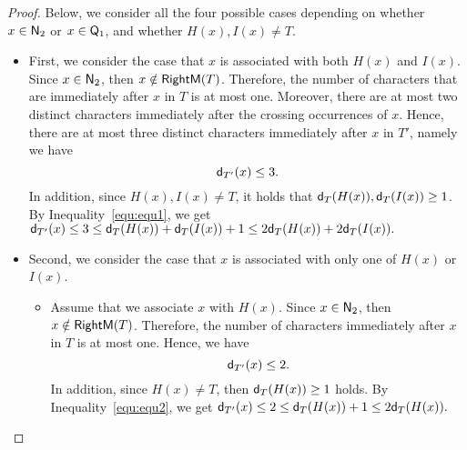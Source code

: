   \begin{proof}
    Below, we consider all the four possible cases depending on whether $x \in \mathsf{N}_{\mathrm{2}}$ or $x \in \mathsf{Q}_{\mathrm{1}}$, and whether $H(x), I(x) \neq T$. 

    \begin{itemize}
    \item
    First, we consider the case that $x$ is associated with both $H(x)$ and $I(x)$.
    Since $x \in \mathsf{N}_{\mathrm{2}}$, then
      $x \notin \mathsf{RightM}(T)$.
    Therefore, the number of characters that are immediately after $x$ in $T$ is at most one.
    Moreover, there are at most two distinct characters immediately after the crossing occurrences of $x$.
    Hence, there are at most three distinct characters immediately after $x$ in $T'$, namely we have 
    \begin{equation}\label{equ:equ1}
      \mathsf{d}_{T'}(x) \le 3.
    \end{equation}
    In addition, since ${H(x),I(x) \ne T}$, it holds that $\mathsf{d}_{T}(H(x)),\mathsf{d}_{T}(I(x)) \ge 1$.
    By Inequality~\ref{equ:equ1}, we get $\mathsf{d}_{T'}(x) \le 3 \le \mathsf{d}_{T}(H(x))+\mathsf{d}_{T}(I(x))+1 \le 2\mathsf{d}_{T}(H(x))+2\mathsf{d}_{T}(I(x)).$

    \item Second, we consider the case that $x$ is associated with only one of $H(x)$ or $I(x)$.
    \begin{itemize}
    \item
    Assume that we associate $x$ with $H(x)$.
    Since $x \in \mathsf{N}_{\mathrm{2}}$, then
      $x \notin \mathsf{RightM}(T)$.
    Therefore, the number of characters immediately after $x$ in $T$ is at most one.
    Hence, we have 
    \begin{equation}\label{equ:equ2}
      \mathsf{d}_{T'}(x) \le 2.
    \end{equation}
    In addition, since ${H(x) \ne T}$, then $\mathsf{d}_{T}(H(x)) \ge 1$ holds.
    By Inequality~\ref{equ:equ2}, we get $\mathsf{d}_{T'}(x) \le 2 \le \mathsf{d}_{T}(H(x))+1 \le 2\mathsf{d}_{T}(H(x)).$
    

\end{itemize}
\end{itemize}
\end{proof}
